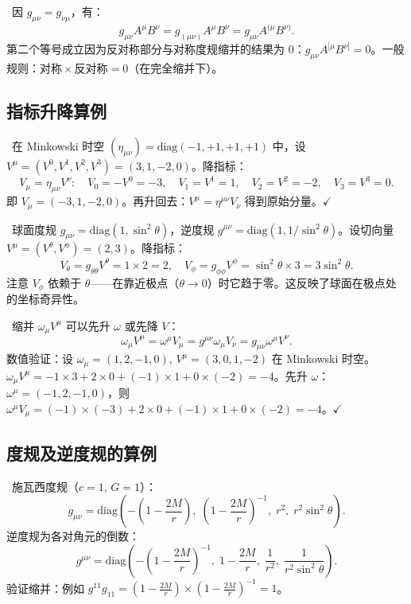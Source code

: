 \
因 $g_{\mu\nu} = g_{\nu\mu}$，有：
\begin{equation}
    g_{\mu\nu} A^\mu B^\nu = g_{(\mu\nu)} A^\mu B^\nu = g_{\mu\nu} A^{(\mu} B^{\nu)}.
\end{equation}
第二个等号成立因为反对称部分与对称度规缩并的结果为 0：$g_{\mu\nu} A^{[\mu} B^{\nu]} = 0$。一般规则：$\text{对称} \times \text{反对称} = 0$（在完全缩并下）。

\subsection{指标升降算例}

\
在 Minkowski 时空 $(\eta_{\mu\nu}) = \text{diag}(-1,+1,+1,+1)$ 中，设 $V^\mu = (V^0, V^1, V^2, V^3) = (3, 1, -2, 0)$。降指标：
\begin{equation}
    V_\mu = \eta_{\mu\nu} V^\nu: \quad V_0 = -V^0 = -3, \quad V_1 = V^1 = 1, \quad V_2 = V^2 = -2, \quad V_3 = V^3 = 0.
\end{equation}
即 $V_\mu = (-3, 1, -2, 0)$。再升回去：$V^\mu = \eta^{\mu\nu} V_\nu$ 得到原始分量。$\checkmark$

\
球面度规 $g_{\mu\nu} = \text{diag}(1, \sin^2\theta)$，逆度规 $g^{\mu\nu} = \text{diag}(1, 1/\sin^2\theta)$。设切向量 $V^\mu = (V^\theta, V^\phi) = (2, 3)$。降指标：
\begin{equation}
    V_\theta = g_{\theta\theta} V^\theta = 1 \times 2 = 2, \quad V_\phi = g_{\phi\phi} V^\phi = \sin^2\theta \times 3 = 3\sin^2\theta.
\end{equation}
注意 $V_\phi$ 依赖于 $\theta$——在靠近极点（$\theta \to 0$）时它趋于零。这反映了球面在极点处的坐标奇异性。

\
缩并 $\omega_\mu V^\mu$ 可以先升 $\omega$ 或先降 $V$：
\begin{equation}
    \omega_\mu V^\mu = \omega^\mu V_\mu = g^{\mu\nu} \omega_\mu V_\nu = g_{\mu\nu} \omega^\mu V^\nu.
\end{equation}
数值验证：设 $\omega_\mu = (1, 2, -1, 0)$, $V^\mu = (3, 0, 1, -2)$ 在 Minkowski 时空。$\omega_\mu V^\mu = -1 \times 3 + 2 \times 0 + (-1) \times 1 + 0 \times (-2) = -4$。先升 $\omega$：$\omega^\mu = (-1, 2, -1, 0)$，则 $\omega^\mu V_\mu = (-1) \times (-3) + 2 \times 0 + (-1) \times 1 + 0 \times (-2) = -4$。$\checkmark$

\subsection{度规及逆度规的算例}

\
施瓦西度规（$c=1$, $G=1$）：
\begin{equation}
    g_{\mu\nu} = \text{diag}\!\left(-\left(1-\frac{2M}{r}\right),\; \left(1-\frac{2M}{r}\right)^{-1},\; r^2,\; r^2\sin^2\theta\right).
\end{equation}
逆度规为各对角元的倒数：
\begin{equation}
    g^{\mu\nu} = \text{diag}\!\left(-\left(1-\frac{2M}{r}\right)^{-1},\; 1-\frac{2M}{r},\; \frac{1}{r^2},\; \frac{1}{r^2\sin^2\theta}\right).
\end{equation}
验证缩并：例如 $g^{11} g_{11} = (1-\frac{2M}{r}) \times (1-\frac{2M}{r})^{-1} = 1$。

